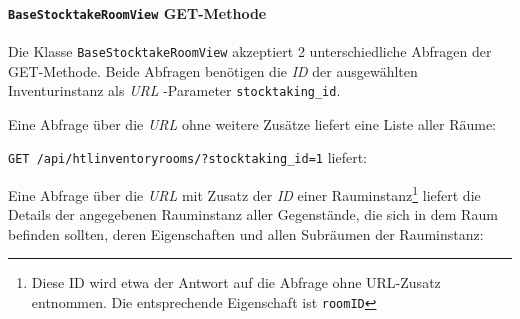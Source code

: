 \hypertarget{basestocktakeroomview-get-methode}{%
\paragraph{\texorpdfstring{\texttt{BaseStocktakeRoomView}
GET-Methode}{BaseStocktakeRoomView GET-Methode}}\label{basestocktakeroomview-get-methode}}

Die Klasse \texttt{BaseStocktakeRoomView} akzeptiert 2 unterschiedliche
Abfragen der GET-Methode. Beide Abfragen benötigen die \emph{ID}
der ausgewählten Inventurinstanz als \emph{URL}
-Parameter
\texttt{stocktaking\_id}.

Eine Abfrage über die \emph{URL}
 ohne weitere Zusätze
liefert eine Liste aller Räume:

\texttt{GET\ /api/htlinventoryrooms/?stocktaking\_id=1} liefert:

\begin{Shaded}
\begin{Highlighting}[]
\FunctionTok{\{}
    \FunctionTok{:} \OtherTok{[}\FunctionTok{\{}
            \FunctionTok{:} \FunctionTok{,}
            \FunctionTok{:} \FunctionTok{,}
            \FunctionTok{:} \FunctionTok{,}
            \FunctionTok{:} \FunctionTok{,}
            \FunctionTok{:} 
        \FunctionTok{\}}\OtherTok{,} \FunctionTok{\{}
            \FunctionTok{:} \FunctionTok{,}
            \FunctionTok{:} \FunctionTok{,}
            \FunctionTok{:} \FunctionTok{,}
            \FunctionTok{:} \FunctionTok{,}
            \FunctionTok{:} 
        \FunctionTok{\}}\OtherTok{,}
    \OtherTok{]}
\FunctionTok{\}}
\end{Highlighting}
\end{Shaded}

Eine Abfrage über die \emph{URL}
 mit Zusatz der \emph{ID}
einer Rauminstanz\footnote{Diese ID wird etwa der Antwort auf die
  Abfrage ohne URL-Zusatz entnommen. Die entsprechende Eigenschaft ist
  \texttt{roomID}} liefert die Details der angegebenen Rauminstanz
\inkl{} aller Gegenstände, die sich in dem Raum befinden sollten, deren
Eigenschaften und allen Subräumen der Rauminstanz:

